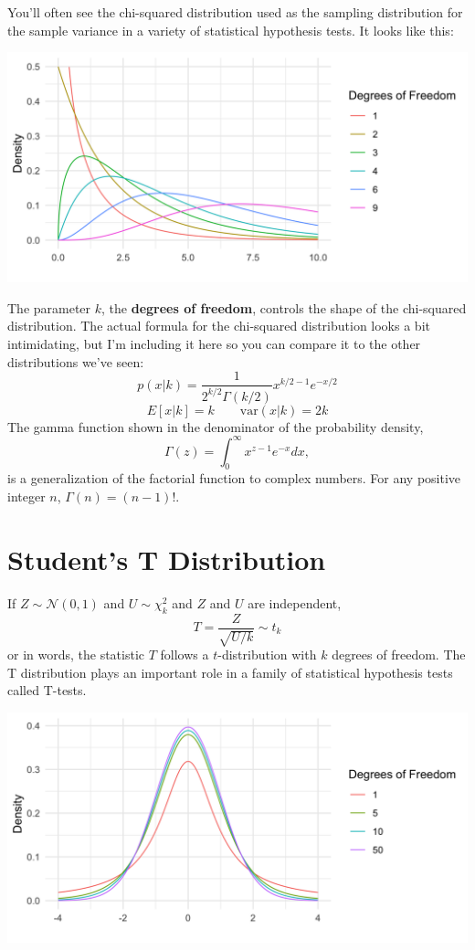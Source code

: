 You'll often see the chi-squared distribution used as the sampling distribution for the sample variance in a variety of statistical hypothesis tests. It looks like this:
\begin{center}
\includegraphics[width=\textwidth]{img/hyp-example-chisq-distribution.png}
\end{center}

The parameter $k$, the \textbf{degrees of freedom}, controls the shape of the chi-squared distribution. The actual formula for the chi-squared distribution looks a bit intimidating, but I'm including it here so you can compare it to the other distributions we've seen:
$$ p(x|k) = \frac{1}{2^{k/2} \Gamma(k/2)} x^{k/2 - 1} e^{-x/2} $$
$$ E[x | k] = k \qquad \text{var}(x | k) = 2k $$ 
The gamma function shown in the denominator of the probability density,
$$ \Gamma(z) = \int_0^{\infty} x^{z-1} e^{-x} dx, $$
is a generalization of the factorial function to complex numbers. For any positive integer $n$, $\Gamma(n) = (n-1)!$. 

\section{Student's T Distribution}

If $Z \sim \mathcal{N}(0, 1)$ and $U \sim \chi_k^2$ and $Z$ and $U$ are independent, 
$$ T = \frac{Z}{\sqrt{U/k}} \sim t_k $$
or in words, the statistic $T$ follows a $t$-distribution with $k$ degrees of freedom. The T distribution plays an important role in a family of statistical hypothesis tests called T-tests. 

\begin{center}
\includegraphics[width=\textwidth]{img/hyp-example-t-distribution.png}
\end{center}

